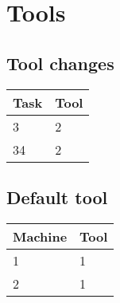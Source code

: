 \documentclass[10pt,a4paper]{report}
\begin{document}
\section*{Tools}
\subsection*{Tool changes}
\begin{tabular}{ll}
Task & Tool\\
\hline
3&2\\
34&2\\
\end{tabular}

\subsection*{Default tool}
\begin{tabular}{ll}
Machine & Tool\\
\hline
1&1\\
2&1\\
\end{tabular}
\end{document}
